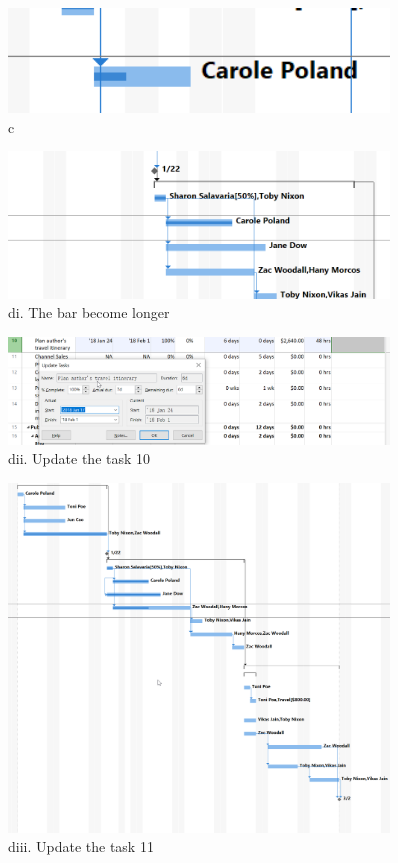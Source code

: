 \documentclass[runningheads]{llncs}
\begin{document}
\begin{figure}[H]
    \centering
    \includegraphics[width=0.9\textwidth]{./image/t3f3}
    \caption{c}
\end{figure}

\begin{figure}[H]
    \centering
    \includegraphics[width=0.9\textwidth]{./image/t3f4}
    \caption{di. The bar become longer}
\end{figure}

\begin{figure}[H]
    \centering
    \includegraphics[width=0.9\textwidth]{./image/t3f5}
    \caption{dii. Update the task 10}
\end{figure}


\begin{figure}[H]
    \centering
    \includegraphics[width=0.9\textwidth]{./image/t3f6}
    \caption{diii. Update the task 11}
\end{figure}
\end{document}
